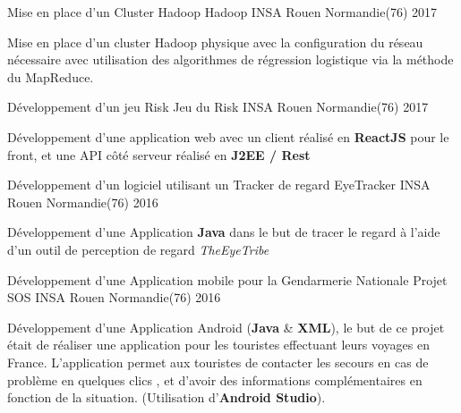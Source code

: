 

\begin{cventries}


  \cventry
	  {Mise en place d'un Cluster Hadoop} %
	  {Hadoop} %
	  {INSA Rouen Normandie(76)} %
	  {2017} %
	  {
	  	\begin{cvitems} %
	  		\item {Mise en place d'un cluster Hadoop physique avec la configuration du réseau nécessaire avec utilisation des algorithmes de régression logistique via la méthode du MapReduce.}
	  	\end{cvitems}
	  }
  \cventry
	  {Développement d'un jeu \og Risk \fg{} } %
	  {Jeu du Risk} %
	  {INSA Rouen Normandie(76)} %
	  {2017} %
	  {
	  	\begin{cvitems} %
	  		\item {Développement d'une application web avec un client réalisé en \textbf{ReactJS} pour le front, et une API côté serveur réalisé en \textbf{J2EE / Rest}}
	  	\end{cvitems}
	  }
  \cventry
	  {Développement d'un logiciel utilisant un Tracker de regard} %
	  {EyeTracker} %
	  {INSA Rouen Normandie(76)} %
	  {2016} %
	  {
	  	\begin{cvitems} %
	  		\item {Développement d'une Application \textbf{Java} dans le but de tracer le regard à l'aide d'un outil de perception de regard \textit{TheEyeTribe}}
	  	\end{cvitems}
	  }
  
  \cventry
	{Développement d'une Application mobile pour la Gendarmerie Nationale} %
	{Projet SOS} %
	{INSA Rouen Normandie(76)} %
	{2016} %
	{
		\begin{cvitems} %
			\item {Développement d'une Application Android (\textbf{Java} \& \textbf{XML}), le but de ce projet était de réaliser une application pour les touristes effectuant leurs voyages en France. L'application permet aux touristes de contacter les secours en cas de problème en quelques clics , et d'avoir des informations complémentaires en fonction de la situation. (Utilisation d'\textbf{Android Studio}). }
		\end{cvitems}
	}


\end{cventries}
